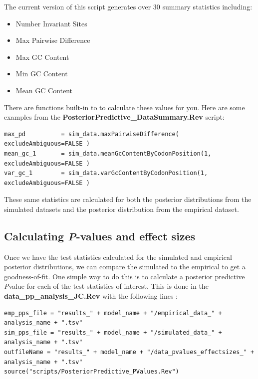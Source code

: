 The current version of this script generates over 30 summary statistics including: 
\begin{itemize}
\item Number Invariant Sites
\item Max Pairwise Difference
\item Max GC Content
\item Min GC Content
\item Mean GC Content
\end{itemize}

There are functions built-in to \RevBayes to calculate these values for you. Here are some examples
from the \textbf{PosteriorPredictive\_DataSummary.Rev} script: 

{\tt \begin{Snugshade}[184,207,236]
\begin{lstlisting}
max_pd          = sim_data.maxPairwiseDifference( excludeAmbiguous=FALSE )
mean_gc_1       = sim_data.meanGcContentByCodonPosition(1, excludeAmbiguous=FALSE )
var_gc_1        = sim_data.varGcContentByCodonPosition(1, excludeAmbiguous=FALSE )
\end{lstlisting}
\end{Snugshade}}

\smallbreak
These same statistics are calculated for both the posterior distributions from the simulated datasets
and the posterior distribution from the empirical dataset.

\subsection{Calculating \textit{P}-values and effect sizes}

Once we have the test statistics calculated for the simulated and empirical posterior distributions, 
we can compare the simulated to the empirical to get a goodness-of-fit. One simple way to do this is to calculate a posterior 
predictive \textit{P}\-value for each of the test statistics of interest. This is done in the \textbf{data\_pp\_analysis\_JC.Rev} with the following lines :

{\tt \begin{Snugshade}[184,207,236]
\begin{lstlisting}
emp_pps_file = "results_" + model_name + "/empirical_data_" + analysis_name + ".tsv"
sim_pps_file = "results_" + model_name + "/simulated_data_" + analysis_name + ".tsv"
outfileName = "results_" + model_name + "/data_pvalues_effectsizes_" + analysis_name + ".tsv"
source("scripts/PosteriorPredictive_PValues.Rev")
\end{lstlisting}
\end{Snugshade}}

